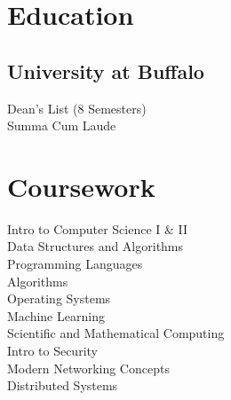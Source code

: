 \documentclass[letterpaper]{deedy-resume} %
\begin{document}
\begin{minipage}[t]{0.33\textwidth} %


\section{Education} 

\subsection{University at Buffalo}

Dean's List (8 Semesters) \\
Summa Cum Laude \\

\sectionspace %


\section{Coursework}

Intro to Computer Science I \& II \\
Data Structures and Algorithms \\
Programming Languages \\
Algorithms \\
Operating Systems \\
Machine Learning \\
Scientific and Mathematical Computing \\
Intro to Security \\
Modern Networking Concepts \\
Distributed Systems \\

\sectionspace %



\end{minipage}
\end{document}

